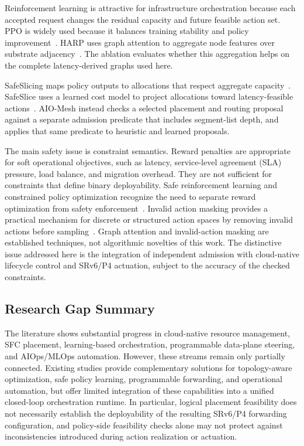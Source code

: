 \documentclass[final,5p]{elsarticle}
\newcommand{\rev}[1]{\textcolor{revisiongreen}{#1}}
\let\newrev\rev
\begin{document}
Reinforcement learning is attractive for infrastructure orchestration because each accepted request changes the residual capacity and future feasible action set. PPO is widely used because it balances training stability and policy improvement~\cite{schulman2017proximal}. \newrev{HARP uses graph attention to aggregate node features over substrate adjacency~\cite{velickovic2018graph}. The ablation evaluates whether this aggregation helps on the complete latency-derived graphs used here.}

\newrev{SafeSlicing maps policy outputs to allocations that respect aggregate capacity~\cite{liu2021safeslicing}. SafeSlice uses a learned cost model to project allocations toward latency-feasible actions~\cite{nagib2025safeslice}. AIO-Mesh instead checks a selected placement and routing proposal against a separate admission predicate that includes segment-list depth, and applies that same predicate to heuristic and learned proposals.}

The main safety issue is constraint semantics. Reward penalties are appropriate for soft operational objectives, such as latency, \rev{service-level agreement (SLA)} pressure, load balance, and migration overhead. They are not sufficient for constraints that define binary deployability. Safe reinforcement learning and constrained policy optimization recognize the need to separate reward optimization from safety enforcement~\cite{gu2024safe,ma2022conservative,wachi2024constraint}. Invalid action masking provides a practical mechanism for discrete or structured action spaces by removing invalid actions before sampling~\cite{huang2022closer}. \newrev{Graph attention and invalid-action masking are established techniques, not algorithmic novelties of this work.} The distinctive issue addressed here is the integration of independent admission with cloud-native lifecycle control and SRv6/P4 actuation, subject to the accuracy of the checked constraints.

\subsection{Research Gap Summary}
\label{subsec:related_gap}
The literature shows substantial progress in cloud-native resource management, SFC placement, learning-based orchestration, programmable data-plane steering, and AIOps/MLOps automation. However, these streams remain only partially connected. \rev{Existing studies provide complementary solutions for topology-aware optimization, safe policy learning, programmable forwarding, and operational automation, but offer limited integration of these capabilities into a unified closed-loop orchestration runtime. In particular, logical placement feasibility does not necessarily establish the deployability of the resulting SRv6/P4 forwarding configuration, and policy-side feasibility checks alone may not protect against inconsistencies introduced during action realization or actuation.}
\end{document}
